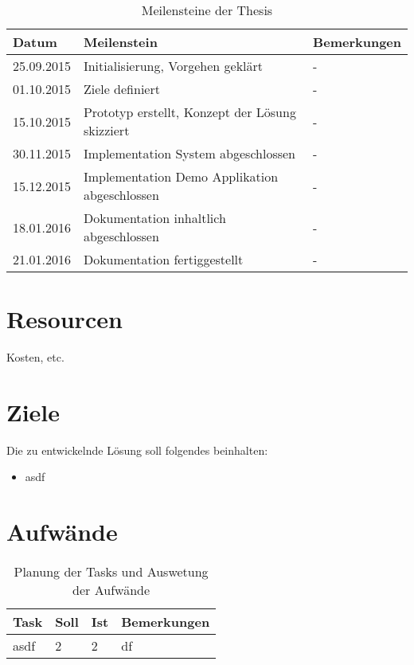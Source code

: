 \begin{table}[h!]
\begin{tabularx}{\textwidth}{|l|X|l|}

 \hline
 {\bf Datum } & {\bf Meilenstein } & {\bf Bemerkungen } \\ 
 \hline
 25.09.2015  &   Initialisierung, Vorgehen geklärt   &     -   \\ \hline
 01.10.2015  &   Ziele definiert   &     -   \\ \hline
 15.10.2015  &   Prototyp erstellt, Konzept der Lösung skizziert   &     -   \\ \hline
 30.11.2015  &   Implementation System abgeschlossen   &     -   \\ \hline
 15.12.2015  &   Implementation Demo Applikation abgeschlossen   &     -   \\ \hline
 18.01.2016  &   Dokumentation inhaltlich abgeschlossen    &     -   \\ \hline
 21.01.2016  &   Dokumentation fertiggestellt    &     -   \\ \hline
 
\end{tabularx}
\caption{Meilensteine der Thesis}
\end{table}


\section{Resourcen}
Kosten, etc.


\section{Ziele}
Die zu entwickelnde Lösung soll folgendes beinhalten:
\begin{itemize}
    \item asdf
\end{itemize}


\section{Aufwände}

\begin{table}[h!]
\begin{tabularx}{\textwidth}{|l|l|l|X|}

 \hline
 {\bf Task } & {\bf Soll } & {\bf Ist }  & {\bf Bemerkungen } \\ 
 \hline
 asdf    &   2   &  2     & df  \\
 \hline

\end{tabularx}
\caption{Planung der Tasks und Auswetung der Aufwände}
\end{table}


